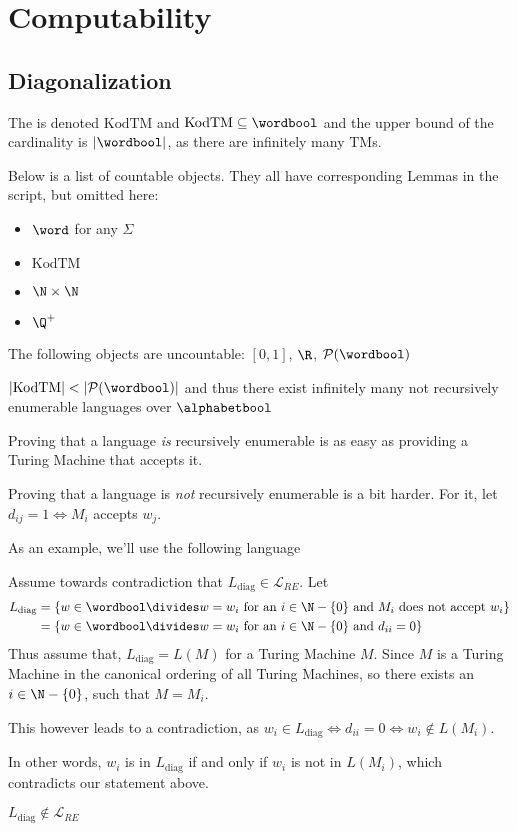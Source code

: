 \newsection
\section{Computability}
\subsection{Diagonalization}
The  is denoted $\text{KodTM}$ and $\text{KodTM} \subseteq \wordbool$ and the upper bound of the cardinality is $|\wordbool|$,
as there are infinitely many TMs.

Below is a list of countable objects. They all have corresponding Lemmas in the script, but omitted here:
\drmvspace
\begin{multicols}{4}
    \begin{itemize}
        \item $\word$ for any $\Sigma$
        \item $\text{KodTM}$
        \item $\N \times \N$
        \item $\Q^+$
    \end{itemize}
\end{multicols}

\rmvspace
\drmvspace
The following objects are uncountable: $[0, 1]$, $\R$, $\mathcal{P}(\wordbool)$

\inlinecorollary $|\text{KodTM}| < |\mathcal{P}(\wordbool)|$ and thus there exist infinitely many not recursively enumerable languages over $\alphabetbool$


Proving that a language \textit{is} recursively enumerable is as easy as providing a Turing Machine that accepts it.

Proving that a language is \textit{not} recursively enumerable is a bit harder. For it, let $d_{ij} = 1 \Longleftrightarrow M_i$ accepts $w_j$.

As an example, we'll use the following language

Assume towards contradiction that $L_\text{diag} \in \mathcal{L}_{RE}$. Let 
\begin{align*}
    L_{\text{diag}} & = \{ w \in \wordbool \divides w = w_i \text{ for an } i \in \N - \{ 0 \} \text{ and $M_i$ does not accept } w_i \} \\
                    & = \{ w \in \wordbool \divides w = w_i \text{ for an } i \in \N - \{ 0 \} \text{ and } d_{ii} = 0\}
\end{align*}
Thus assume that, $L_\text{diag} = L(M)$ for a Turing Machine $M$.
Since $M$ is a Turing Machine in the canonical ordering of all Turing Machines, so there exists an $i \in \N - \{ 0 \}$, such that $M = M_i$.

This however leads to a contradiction, as $w_i \in L_\text{diag} \Longleftrightarrow d_{ii} = 0 \Longleftrightarrow w_i \notin L(M_i)$.

In other words, $w_i$ is in $L_\text{diag}$ if and only if $w_i$ is not in $L(M_i)$, which contradicts our statement above.

\inlinetheorem $L_\text{diag} \notin \mathcal{L}_{RE}$
